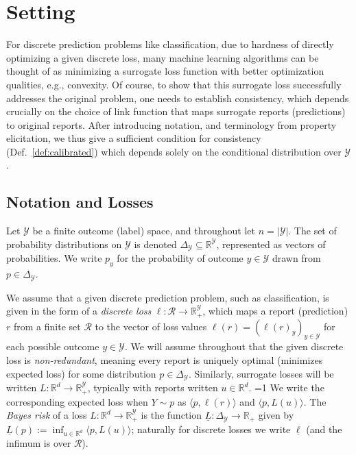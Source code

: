\documentclass[12pt]{article}
\newcommand{\Comments}{1}
\newcommand{\mytodo}[2]{\ifnum\Comments=1%
  \todo[linecolor=#1!80!black,backgroundcolor=#1,bordercolor=#1!80!black]{#2}\fi}
\newcommand{\raft}[1]{\mytodo{green!20!white}{RF: #1}}
\newcommand{\reals}{\mathbb{R}}
\newcommand{\simplex}{\Delta_\Y}
\newcommand{\R}{\mathcal{R}}
\newcommand{\Y}{\mathcal{Y}}
\newcommand{\risk}[1]{\underline{#1}}
\newcommand{\inprod}[2]{\langle #1, #2 \rangle}%
\begin{document}


\section{Setting}
\label{sec:setting}

For discrete prediction problems like classification, due to hardness of directly optimizing a given discrete loss, many machine learning algorithms can be thought of as minimizing a surrogate loss function with better optimization qualities, e.g., convexity.
Of course, to show that this surrogate loss successfully addresses the original problem, one needs to establish consistency, which depends crucially on the choice of link function that maps surrogate reports (predictions) to original reports.
After introducing notation, and terminology from property elicitation, we thus give a sufficient condition for consistency (Def.~\ref{def:calibrated}) which depends solely on the conditional distribution over $\Y$.

\subsection{Notation and Losses}

Let $\Y$ be a finite outcome (label) space, and throughout let $n=|\Y|$.
The set of probability distributions on $\Y$ is denoted $\simplex\subseteq\reals^{\Y}$, represented as vectors of probabilities.
We write $p_y$ for the probability of outcome $y \in \Y$ drawn from $p \in \simplex$.

We assume that a given discrete prediction problem, such as classification, is given in the form of a \emph{discrete loss} $\ell:\R\to\reals^\Y_+$, which maps a report (prediction) $r$ from a finite set $\R$ to the vector of loss values $\ell(r) = (\ell(r)_y)_{y\in\Y}$ for each possible outcome $y\in\Y$.
We will assume throughout that the given discrete loss is \emph{non-redundant}, meaning every report is uniquely optimal (minimizes expected loss) for some distribution $p\in\simplex$.
Similarly, surrogate losses will be written $L:\reals^d\to\reals^\Y_+$, typically with reports written $u\in\reals^d$.
\raft{Cut generic loss}%
We write the corresponding expected loss when $Y \sim p$ as $\inprod{p}{\ell(r)}$ and $\inprod{p}{L(u)}$.
The \emph{Bayes risk} of a loss $L:\reals^d\to\reals^\Y_+$ is the function $\risk{L}:\simplex\to\reals_+$ given by $\risk{L}(p) := \inf_{u\in\reals^d} \inprod{p}{L(u)}$; naturally for discrete losses we write $\risk{\ell}$ (and the infimum is over $\R$).
\end{document}
